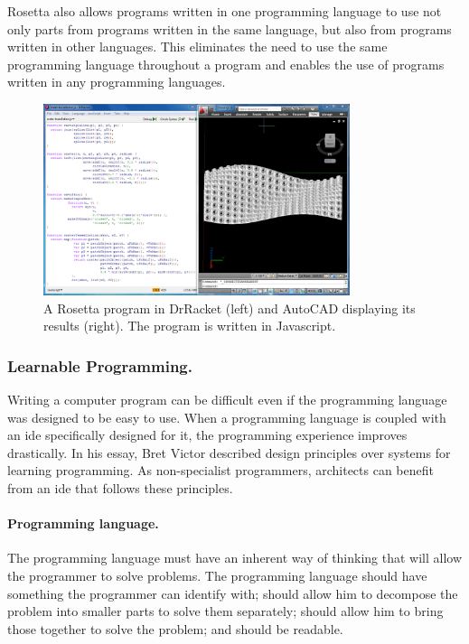 \documentclass{./llncs2e/llncs}
\begin{document}
	Rosetta also allows programs written in one programming language to use not only parts from programs written in the same language, but also from programs written in other languages.
	This eliminates the need to use the same programming language throughout a program and enables the use of programs written in any programming languages.
	
	\begin{figure}
		\centering
		\includegraphics[width=0.8\textwidth]{img/rosetta_js_autocad}
		\caption{A Rosetta program in DrRacket (left) and AutoCAD displaying its results (right). The program is written in Javascript.}
		\label{fig:rosetta:ex}
	\end{figure} 


\subsubsection{Learnable Programming.}
	Writing a computer program can be difficult even if the programming language was designed to be easy to use. 
	When a programming language is coupled with an \ac{ide} specifically designed for it, the programming experience improves drastically. 
	In his essay\cite{victor2012learnable}, Bret Victor described design principles over systems for learning programming.
	As non-specialist programmers, architects can benefit from an \ac{ide} that follows these principles.

	\paragraph{Programming language.}
	The programming language must have an inherent way of thinking that will allow the programmer to solve problems.
	The programming language should have something the programmer can identify with; should allow him to decompose the problem into smaller parts to solve them separately; should allow him to bring those together to solve the problem; and should be readable.
	
\end{document}
